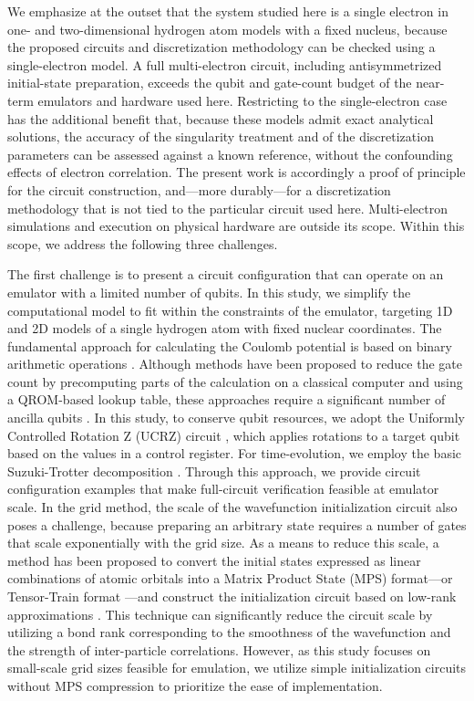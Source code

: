 \documentclass[aip-draft.tex]{subfiles}
\begin{document}
We emphasize at the outset that the system studied here is a single
electron in one- and two-dimensional hydrogen atom models with a fixed
nucleus, because the proposed circuits and discretization methodology can be
checked using a single-electron model. A full multi-electron circuit,
including antisymmetrized initial-state preparation, exceeds the qubit and
gate-count budget of the near-term emulators and hardware used here.
Restricting to the single-electron case has the additional benefit
that, because these models admit exact analytical solutions, the accuracy
of the singularity treatment and of the discretization parameters can be
assessed against a known reference, without the confounding effects of
electron correlation. The present work is accordingly a proof of
principle for the circuit construction, and---more durably---for a
discretization methodology that is not tied to the particular circuit
used here. Multi-electron simulations and execution on physical hardware
are outside its scope. Within this scope, we address the following three
challenges.

The first challenge is to present a circuit configuration that can operate on an
emulator with a limited number of qubits. In this study, we simplify the
computational model to fit within the constraints of the emulator, targeting 1D and
2D models of a single hydrogen atom with fixed nuclear coordinates. The
fundamental approach for calculating the Coulomb potential is based on binary
arithmetic operations \cite{Zalka-rspa.1998.0162}. Although methods have been
proposed to reduce the gate count by precomputing parts of the calculation on a
classical computer and using a QROM-based lookup table, these approaches require
a significant number of ancilla qubits \cite{Sanders2020.PRXQuantum.1.020312}.
In this study, to conserve qubit resources, we adopt the Uniformly Controlled
Rotation Z (UCRZ) circuit \cite{Mottonen2004.PhysRevLett.93.130502}, which
applies rotations to a target qubit based on the values in a control register.
For time-evolution, we employ the basic Suzuki-Trotter
decomposition \cite{Zalka-rspa.1998.0162}. Through this approach, we provide circuit configuration examples that make
full-circuit verification feasible at emulator scale. In the grid method, the scale of the wavefunction initialization
circuit also poses a challenge, because preparing an arbitrary state requires a
number of gates that scale exponentially with the grid size. As a means to
reduce this scale, a method has been proposed to convert the initial states
expressed as linear combinations of atomic orbitals into a Matrix Product State
(MPS) format---or Tensor-Train format
\cite{Oseledets2011.doi:10.1137/090752286}---and construct the initialization
circuit based on low-rank approximations \cite{Huggins2025.PRXQuantum.6.020319}.
This technique can significantly reduce the circuit scale by utilizing a bond
rank corresponding to the smoothness of the wavefunction and the strength of
inter-particle correlations. However, as this study focuses on small-scale
grid sizes feasible for emulation, we utilize simple initialization circuits
without MPS compression to prioritize the ease of implementation. 
\end{document}
